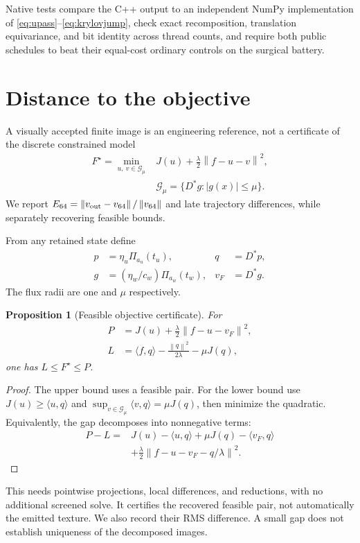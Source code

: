 \documentclass[10pt,twocolumn]{article}
\newtheorem{proposition}{Proposition}[section]
\theoremstyle{definition}\newtheorem{remark}[proposition]{Remark}
\newcommand{\norm}[1]{\left\lVert#1\right\rVert}
\begin{document}
Native tests compare the C++ output to an independent NumPy implementation of
\eqref{eq:upass}--\eqref{eq:krylovjump}, check exact recomposition, translation
equivariance, and bit identity across thread counts, and require both public
schedules to beat their equal-cost ordinary controls on the surgical battery.


\section{Distance to the objective}
A visually accepted finite image is an engineering reference, not a
certificate of the discrete constrained model
\begin{align}
F^\star=\min_{u,\ v\in\mathcal G_\mu}
&J(u)+\frac{\lambda}{2}\norm{f-u-v}^2,\nonumber\\
&\mathcal G_\mu=\{D^*g:|g(x)|\le\mu\}.
\label{eq:objective}
\end{align}
We report $E_{64}=\norm{v_{\rm out}-v_{64}}/\norm{v_{64}}$ and late
trajectory differences, while separately recovering feasible bounds.

From any retained state define
\begin{align}
p&=\eta_u\Pi_{a_u}(t_u),&q&=D^*p,\nonumber\\
g&=(\eta_w/c_w)\Pi_{a_w}(t_w),&v_F&=D^*g.
\end{align}
The flux radii are one and $\mu$ respectively.
\begin{proposition}[Feasible objective certificate]
For
\begin{align}
P&=J(u)+\frac{\lambda}{2}\norm{f-u-v_F}^2,\nonumber\\
L&=\langle f,q\rangle-\frac{\norm q^2}{2\lambda}-\mu J(q),
\end{align}
one has $L\le F^\star\le P$.
\end{proposition}
\begin{proof}
The upper bound uses a feasible pair. For the lower bound use
$J(u)\ge\langle u,q\rangle$ and
$\sup_{v\in\mathcal G_\mu}\langle v,q\rangle=\mu J(q)$, then minimize the
quadratic. Equivalently, the gap decomposes into nonnegative terms:
\begin{align}
P-L={}&J(u)-\langle u,q\rangle+\mu J(q)-\langle v_F,q\rangle\nonumber\\
&+\frac{\lambda}{2}\norm{f-u-v_F-q/\lambda}^2.
\label{eq:gap}
\end{align}
\end{proof}
This needs pointwise projections, local differences, and reductions, with
no additional screened solve. It certifies the recovered feasible pair,
not automatically the emitted texture. We also record their RMS difference.
A small gap does not establish uniqueness of the decomposed images.
\end{document}
